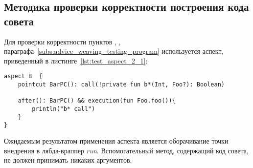 \subsection{Методика проверки корректности построения кода совета}
\label{sub:advice_building_methodology}
Для проверки корректности пунктов \quotes{\ref{list:lambda_wrapper_check}},
\quotes{\ref{list:buffer_method_check}},
\quotes{\ref{list:pointcut_call_check}} параграфа~\ref{subs:advice_weaving_testing_program}  используется аспект, приведенный в листинге~\ref{lst:test_aspect_2_1}:
\begin{lstlisting}[style={java}, label={lst:test_aspect_2_1},
  caption={Пример тестового аспекта}]
aspect B  {
    pointcut BarPC(): call(!private fun b*(Int, Foo?): Boolean)

    after(): BarPC() && execution(fun Foo.foo()){
        println("b* call")
    }
}
\end{lstlisting}
Ожидаемым результатом применения аспекта является оборачивание точки внедрения в лябда-враппер \textit{run}.
Вспомогательный метод, содержащий код совета, не должен принимать никаких аргументов.

